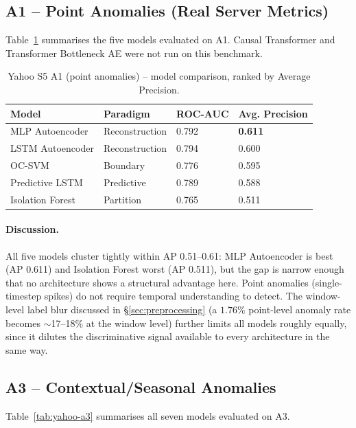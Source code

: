 \subsection{A1 -- Point Anomalies (Real Server Metrics)}

Table~\ref{tab:yahoo-a1} summarises the five models evaluated on A1. Causal Transformer and Transformer Bottleneck AE were not run on this benchmark.

\begin{table}[h]
\centering
\begin{tabular}{@{}llll@{}}
\toprule
Model & Paradigm & ROC-AUC & Avg. Precision \\
\midrule
MLP Autoencoder  & Reconstruction & 0.792 & \textbf{0.611} \\
LSTM Autoencoder & Reconstruction & 0.794 & 0.600 \\
OC-SVM           & Boundary       & 0.776 & 0.595 \\
Predictive LSTM  & Predictive     & 0.789 & 0.588 \\
Isolation Forest & Partition      & 0.765 & 0.511 \\
\bottomrule
\end{tabular}
\caption{Yahoo S5 A1 (point anomalies) -- model comparison, ranked by Average Precision.}
\label{tab:yahoo-a1}
\end{table}

\paragraph{Discussion.} All five models cluster tightly within AP 0.51--0.61: MLP Autoencoder is best (AP 0.611) and Isolation Forest worst (AP 0.511), but the gap is narrow enough that no architecture shows a structural advantage here. Point anomalies (single-timestep spikes) do not require temporal understanding to detect. The window-level label blur discussed in \S\ref{sec:preprocessing} (a $1.76\%$ point-level anomaly rate becomes $\sim$17--18\% at the window level) further limits all models roughly equally, since it dilutes the discriminative signal available to every architecture in the same way.

\subsection{A3 -- Contextual/Seasonal Anomalies}

Table~\ref{tab:yahoo-a3} summarises all seven models evaluated on A3.

